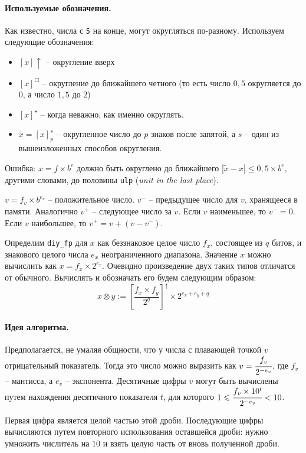 \documentclass[a4paper, 12pt, twoside]{article}
\begin{document}
\paragraph{Используемые обозначения.}
Как известно, числа с \texttt{5} на конце, могут округляться по-разному.
Используем следующие обозначения:
\begin{itemize}
\item $[x]\uparrow$ -- округление вверх
\item $[x]^\Box$ -- округление до ближайшего четного (то есть число $0,5$ округляется до $0$, а число $1,5$ до $2$)
\item $[x]^\star$ -- когда неважно, как именно округлять.
\item $\tilde x = \left[ x \right]_p^s$ -- округленное число до $p$ знаков после запятой, а $s$ -- один из вышеизложенных способов округления.
\end{itemize}

Ошибка: $x=f \times b^e$ должно быть округлено до ближайшего $|\tilde x - x| \leqslant 0,5 \times b^e$, другими словами, до половины \texttt{ulp} (\textit{unit in the last place}).

$v=f_v \times b^{e_v}$ -- положительное число.
$v^{-}$ -- предыдущее число для $v$, хранящееся в памяти.
Аналогично $v^{+}$ -- следующее число за $v$.
Если $v$ наименьшее, то $v^{-} = 0$.
Если $v$ наибольшее, то $v^{+} = v + (v - v^{-})$.


Определим \texttt{diy\_fp} для $x$ как беззнаковое целое число $f_x$, состоящее из $q$ битов, и знакового целого числа $e_x$ неограниченного диапазона. 
Значение $x$ можно вычислить как $x= f_x \times 2^{e_x}$.
Очевидно произведение двух таких типов отличатся от обычного.
Вычислять и обозначать его будем следующим образом:
$$x \otimes y := \left[ \frac{f_x \times f_y}{2^q}\right]^\uparrow \times 2^{e_x+e_y+q}$$


\paragraph{Идея алгоритма.}
Предполагается, не умаляя общности, что у числа с плавающей точкой $v$ отрицательный показатель. 
Тогда это число можно выразить как $v=\cfrac{f_v}{2^{-e_v}}$, где $f_v$ -- мантисса, а $e_v$ -- экспонента. 
Десятичные цифры $v$ могут быть вычислены путем нахождения десятичного показателя $t$, для которого $1 \leqslant \cfrac{f_v \times 10^t}{2^{-e_v}} < 10$.

Первая цифра является целой частью этой дроби. 
Последующие цифры вычисляются путем повторного использования оставшейся дроби: нужно умножить числитель на $10$ и взять целую часть от вновь полученной дроби.
\end{document}
